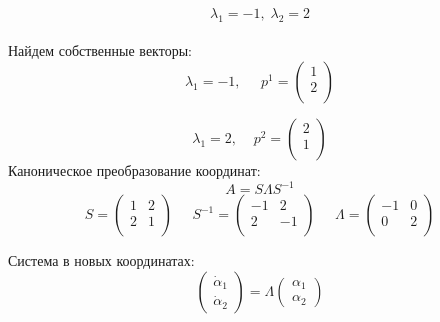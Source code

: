 \documentclass[a4paper, 12pt]{article}
\begin{document}
\[\lambda_1=-1, \; \lambda_2=2\]
\\Найдем собственные векторы:
\[\lambda_1=-1,\;\;\;\;\; p^1=
\left(
\begin{array}{cc}
1\\
2\\
\end{array}
\right)
\]



\[\lambda_1=2,\;\;\;\; p^2=
\left(
\begin{array}{cc}
2\\
1\\
\end{array}
\right)
\]
Каноническое преобразование координат:
\[A = S\Lambda S^{-1}\]
\[
S = \left(
\begin{array}{cc}
1 & 2\\
2 & 1\\
\end{array}
\right)\;\;\;\;\;
S^{-1} = \left(
\begin{array}{cc}
-1 & 2\\
2 & -1\\
\end{array}\right)\;\;\;\;\;
\Lambda = \left(
\begin{array}{cc}
-1 & 0\\
0 & 2\\
\end{array}\right)
\]

Система в новых координатах:
\[\left(
\begin{array}{c}
\dot{\alpha}_1\\
\dot{\alpha}_2
\end{array}
\right)=\Lambda\left(
\begin{array}{c}
{\alpha}_1 \\
{\alpha}_2
\end{array}
\right)\]
\end{document}
